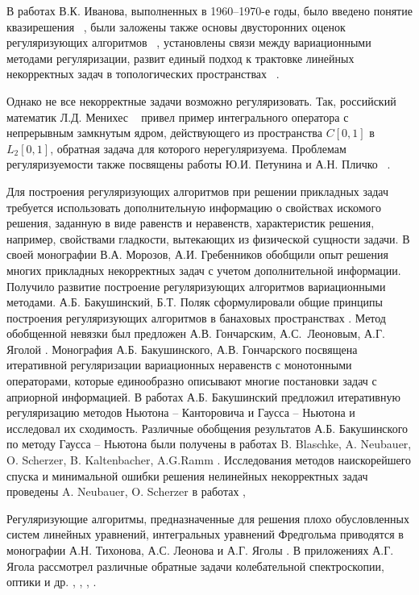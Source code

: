{В работах В.К. Иванова, выполненных в 1960--1970-е годы, было введено понятие квазирешения ~\cite{Iv1962_2, Iv1963}, были заложены также основы двусторонних оценок регуляризующих алгоритмов ~\cite{Iv1966}, установлены связи между вариационными методами регуляризации, развит единый подход к трактовке линейных некорректных задач в топологических пространствах ~\cite{Iv1967}. 

Однако не все некорректные задачи возможно регуляризовать. Так, российский математик Л.Д. Менихес ~\cite{Menih1978} привел пример интегрального оператора с непрерывным замкнутым ядром, действующего из пространства \( C[0,1] \) в \( L_2[0,1] \), обратная задача для которого нерегуляризуема. Проблемам регуляризуемости также посвящены работы Ю.И. Петунина и А.Н. Пличко ~\cite{PetPlich1980}.

Для построения регуляризующих алгоритмов при решении прикладных задач требуется использовать дополнительную информацию о свойствах искомого решения, заданную в виде равенств и неравенств, характеристик решения, например, свойствами гладкости, вытекающих из физической сущности задачи. В своей монографии \cite{MorGre1992} В.А. Морозов, А.И. Гребенников обобщили опыт решения многих прикладных  некорректных задач с учетом дополнительной информации. Получило развитие построение регуляризующих алгоритмов вариационными методами. А.Б. Бакушинский, Б.Т. Поляк сформулировали общие принципы построения регуляризующих алгоритмов в банаховых пространствах \cite{BakPol1974}. Метод обобщенной невязки был предложен А.В. Гончарским, А.С.~Леоновым, А.Г. Яголой \cite{GonLeoYag1973}. Монография А.Б. Бакушинского, А.В. Гончарского \cite{BakGon1989} посвящена итеративной регуляризации вариационных неравенств с монотонными операторами, которые единообразно описывают многие постановки задач с априорной информацией. В работах \cite{Bak1976,Bak1992} А.Б. Бакушинский предложил итеративную регуляризацию методов Ньютона -- Канторовича и Гаусса -- Ньютона и исследовал их сходимость. Различные обобщения результатов А.Б. Бакушинского по методу Гаусса -- Ньютона были получены в работах B. Blaschke, A. Neubauer, O. Scherzer, B. Kaltenbacher, A.G.Ramm \cite{BlaNeuSch1997,KalNeuRam2002}. Исследования методов наискорейшего спуска и минимальной ошибки решения нелинейных некорректных задач проведены A. Neubauer, O. Scherzer в работах  \cite{NeuSch1995_1,NeuSch1995_2,Sch1995},

Регуляризующие алгоритмы, предназначенные для решения плохо обусловленных систем линейных уравнений, интегральных уравнений Фредгольма приводятся в монографии А.Н. Тихонова, А.С. Леонова и А.Г. Яголы \cite{TihLeoYag2017}. В приложениях А.Г. Ягола рассмотрел различные обратные задачи колебательной спектроскопии, оптики и др. \cite{KliKosLiYag2016}, \cite{IsaLukTihYag2017}, \cite{KocKurPenYag2017}, \cite{LukYag2016}.

}
